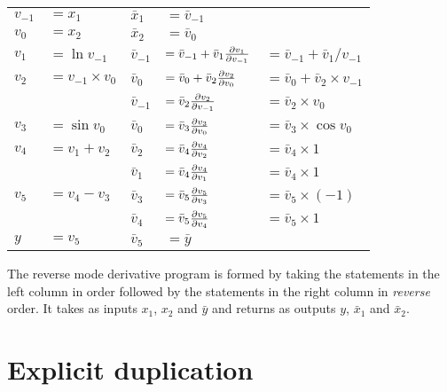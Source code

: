 \documentclass[12pt]{article}
\begin{document}
\begin{tabular}[t]{ll|lll}

  $v_{-1}$ & $= x_1$
  &
  $\bar{x}_1$ & $= \bar{v}_{-1}$
  \\
  
  $v_{0}$ & $= x_2$
  &
  $\bar{x}_2$ & $= \bar{v}_{0}$
  \\

  \hline

  $v_1$ & $= \ln{v_{-1}}$
  &
  \(\bar{v}_{-1}\)
  &
  \(= \bar{v}_{-1} + \bar{v}_{1} \frac{\partial v_{1}}{\partial v_{-1}}\)
  &
  \(= \bar{v}_{-1} + \bar{v}_1 / v_{-1}
  \) \\

  $v_2$ & $= v_{-1} \times v_0$
  &
  \(\bar{v}_0\)
  &
  \(= \bar{v}_0 + \bar{v}_{2} \frac{\partial v_{2}}{\partial v_{0}}\)
  &
  \(= \bar{v}_0 + \bar{v}_2 \times v_{-1}
  \) \\

  &
  &
  \(\bar{v}_{-1}\)
  &
  \(= \bar{v}_{2} \frac{\partial v_{2}}{\partial v_{-1}}\)
  &
  \(
  = \bar{v}_2 \times v_{0}
  \) \\

  $v_3$ & $= \sin{v_0}$
  &
  \(\bar{v}_0\)
  &
  \(= \bar{v}_{3} \frac{\partial v_{3}}{\partial v_{0}}\)
  &
  \(
  = \bar{v}_3 \times \cos v_0
  \) \\

  $v_4$ & $= v_1 + v_2$
  &
  \(\bar{v}_2\)
  &
  \(= \bar{v}_{4} \frac{\partial v_{4}}{\partial v_{2}}\)
  &
  \(
  = \bar{v}_4 \times 1
  \) \\

  &
  &
  \(\bar{v}_1\)
  &
  \(= \bar{v}_{4} \frac{\partial v_{4}}{\partial v_{1}}\)
  &
  \(
  = \bar{v}_4 \times 1
  \) \\

  $v_5$ & $= v_4 - v_3$
  &
  \(\bar{v}_3\)
  &
  \(= \bar{v}_{5} \frac{\partial v_{5}}{\partial v_{3}}\)
  &
  \(
  = \bar{v}_5 \times (-1)
  \) \\
  
  &
  &
  \(\bar{v}_4\)
  &
  \(= \bar{v}_{5} \frac{\partial v_{5}}{\partial v_{4}}\)
  &
  \(
  = \bar{v}_5 \times 1
  \) \\
  
  \hline

  $y$ & $= v_5$
  &
  $\bar{v}_5$ & $= \bar{y}$
  \\

\end{tabular}

The reverse mode derivative program is formed by taking the statements
in the left column in order followed by the statements in the right
column in \emph{reverse} order.  It takes as inputs $x_1$, $x_2$ and
$\bar{y}$ and returns as outputs $y$, $\bar{x}_1$ and $\bar{x}_2$.

\section{Explicit duplication}
\end{document}
